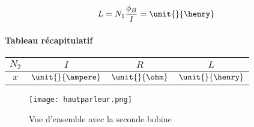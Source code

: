 $$L = N_1 \frac{\phi_B}{I} = \unit{}{\henry}$$

\paragraph{Tableau récapitulatif}

\begin{center}
	\begin{tabular}{c|c|c|c}
		$N_2$ & $I$ & $R$ & $L$ \\
		\hline
		 $x$ & $\unit{}{\ampere}$ & $\unit{}{\ohm}$ & $\unit{}{\henry}$ \\
	\end{tabular}
\end{center}

\begin{figure}[h]
\centering
\texttt{[image: hautparleur.png]}
\caption{Vue d'ensemble avec la seconde bobine}
\label{Vue d'ensemble avec la seconde bobine}
\end{figure}



